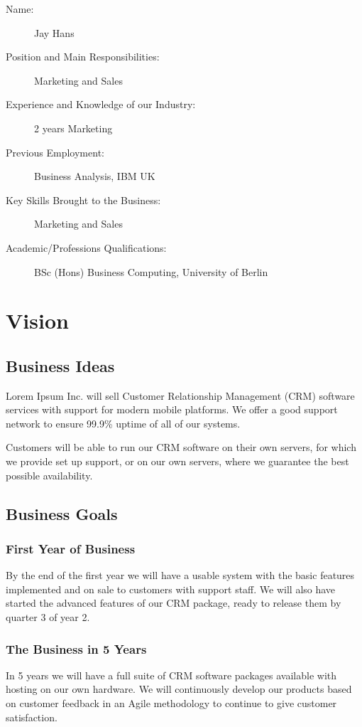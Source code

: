 \documentclass[DIV=calc, paper=a4, fontsize=11pt]{scrartcl}	 %
\begin{document}
\begin{description}
\item[Name:] Jay Hans
\item[Position and Main Responsibilities:] Marketing and Sales
\item[Experience and Knowledge of our Industry:] 2 years Marketing
\item[Previous Employment:] Business Analysis, IBM UK
\item[Key Skills Brought to the Business:] Marketing and Sales
\item[Academic/Professions Qualifications:] BSc (Hons) Business Computing, University of Berlin
\end{description}


\section{Vision}

\subsection{Business Ideas}
Lorem Ipsum Inc. will sell Customer Relationship Management (CRM) software services with support
for modern mobile platforms. We offer a good support network to ensure 99.9\% uptime of all of our
systems.

Customers will be able to run our CRM software on their own servers, for which we provide set up
support, or on our own servers, where we guarantee the best possible availability.

\subsection{Business Goals}
\subsubsection*{First Year of Business}
By the end of the first year we will have a usable system with the basic features implemented and
on sale to customers with support staff. We will also have started the advanced features of our
CRM package, ready to release them by quarter 3 of year 2. 

\subsubsection*{The Business in 5 Years}
In 5 years we will have a full suite of CRM software packages available with hosting on our own
hardware. We will continuously develop our products based on customer feedback in an Agile 
methodology to continue to give customer satisfaction.
\end{document}

